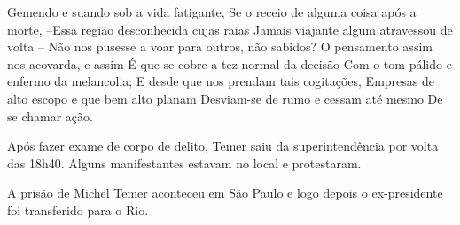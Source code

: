 Gemendo e suando sob a vida fatigante,
Se o receio de alguma coisa após a morte,
–Essa região desconhecida cujas raias
Jamais viajante algum atravessou de volta –
Não nos pusesse a voar para outros, não sabidos?
O pensamento assim nos acovarda, e assim
É que se cobre a tez normal da decisão
Com o tom pálido e enfermo da melancolia;
E desde que nos prendam tais cogitações,
Empresas de alto escopo e que bem alto planam
Desviam-se de rumo e cessam até mesmo
De se chamar ação.


Após fazer exame de corpo de delito, Temer saiu da superintendência por volta das 18h40. Alguns manifestantes estavam no local e protestaram.

A prisão de Michel Temer aconteceu em São Paulo e logo depois o ex-presidente foi transferido para o Rio.